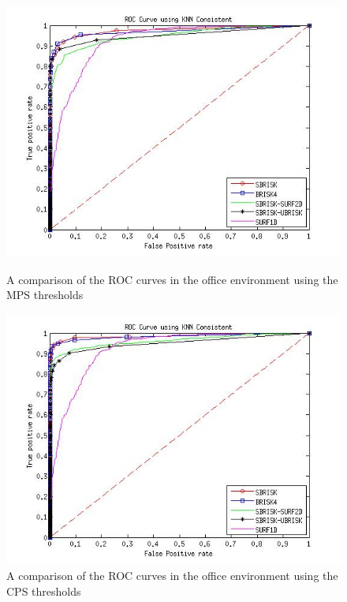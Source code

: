 \documentclass{article}
\begin{document}
\begin{figure}[h!]
\begin{minipage}[b]{0.5\linewidth}
\includegraphics[scale=0.4]{../Drawings/dataset2_ROC_General_KNN.jpg}
\caption{A comparison of the ROC curves in the office environment using the MPS thresholds}
\label{fig:compareKnnOffice}
\end{minipage}
\hspace{0.5cm}
\begin{minipage}[b]{0.5\linewidth}
\includegraphics[scale=0.4]{../Drawings/dataset2_ROC_General_KNN_Consistent.jpg}
\caption{A comparison of the ROC curves in the office environment using the CPS thresholds}
\label{fig:compareKnnConsistentOffice}
\end{minipage}

\end{figure}
\end{document}
